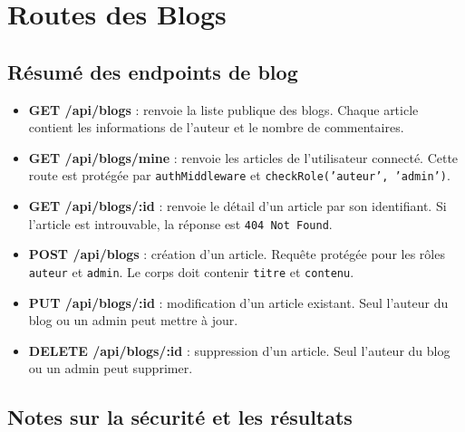 \documentclass[a4paper,12pt]{book}
\begin{document}
\section{Routes des Blogs}

\subsection{Résumé des endpoints de blog}
\begin{itemize}
    \item \textbf{GET /api/blogs} : renvoie la liste publique des blogs. Chaque article contient les informations de l'auteur et le nombre de commentaires.
    \item \textbf{GET /api/blogs/mine} : renvoie les articles de l'utilisateur connecté. Cette route est protégée par \texttt{authMiddleware} et \texttt{checkRole('auteur', 'admin')}.
    \item \textbf{GET /api/blogs/:id} : renvoie le détail d'un article par son identifiant. Si l'article est introuvable, la réponse est \texttt{404 Not Found}.
    \item \textbf{POST /api/blogs} : création d'un article. Requête protégée pour les rôles \texttt{auteur} et \texttt{admin}. Le corps doit contenir \texttt{titre} et \texttt{contenu}.
    \item \textbf{PUT /api/blogs/:id} : modification d'un article existant. Seul l'auteur du blog ou un admin peut mettre à jour.
    \item \textbf{DELETE /api/blogs/:id} : suppression d'un article. Seul l'auteur du blog ou un admin peut supprimer.
\end{itemize}

\subsection{Notes sur la sécurité et les résultats}
\end{document}
